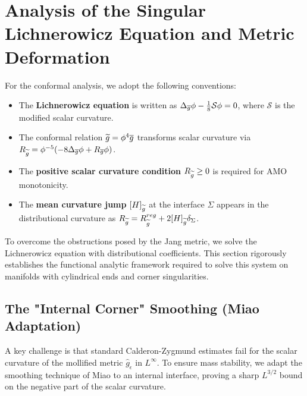 \section{Analysis of the Singular Lichnerowicz Equation and Metric Deformation}
\label{sec:Analysis}

\begin{remark}
For the conformal analysis, we adopt the following conventions:
\begin{itemize}
    \item The \textbf{Lichnerowicz equation} is written as $\Delta_{\overline{g}} \phi - \frac{1}{8} \mathcal{S} \phi = 0$, where $\mathcal{S}$ is the modified scalar curvature.
    \item The conformal relation $\widetilde{g} = \phi^4 \overline{g}$ transforms scalar curvature via $R_{\widetilde{g}} = \phi^{-5}(-8\Delta_{\overline{g}}\phi + R_{\overline{g}}\phi)$.
    \item The \textbf{positive scalar curvature condition} $R_{\widetilde{g}} \ge 0$ is required for AMO monotonicity.
    \item The \textbf{mean curvature jump} $[H]_{\widetilde{g}}$ at the interface $\Sigma$ appears in the distributional curvature as $R_{\widetilde{g}} = R_{\widetilde{g}}^{reg} + 2[H]_{\widetilde{g}}\delta_\Sigma$.
\end{itemize}
\end{remark}

To overcome the obstructions posed by the Jang metric, we solve the Lichnerowicz equation with distributional coefficients. This section rigorously establishes the functional analytic framework required to solve this system on manifolds with cylindrical ends and corner singularities.

\subsection{The "Internal Corner" Smoothing (Miao Adaptation)}
\label{sec:MiaoSmoothing}

A key challenge is that standard Calderon-Zygmund estimates fail for the scalar curvature of the mollified metric $\hat{g}_\epsilon$ in $L^\infty$. To ensure mass stability, we adapt the smoothing technique of Miao \cite{miao2002} to an internal interface, proving a sharp $L^{3/2}$ bound on the negative part of the scalar curvature.

